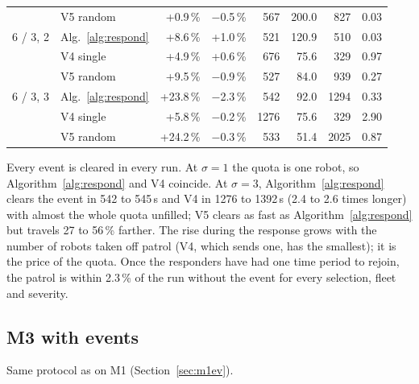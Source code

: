 \documentclass[11pt]{article}
\theoremstyle{definition}
\theoremstyle{plain}
\begin{document}
\begin{table}[H]
\begin{tabular}{llrrrrrr}
 & V5 random & +0.9\,\% & $-$0.5\,\% & 567 & 200.0 & 827 & 0.03 \\
6 / 3, 2 & Alg.~\ref{alg:respond} & +8.6\,\% & +1.0\,\% & 521 & 120.9 & 510 & 0.03 \\
 & V4 single & +4.9\,\% & +0.6\,\% & 676 & 75.6 & 329 & 0.97 \\
 & V5 random & +9.5\,\% & $-$0.9\,\% & 527 & 84.0 & 939 & 0.27 \\
6 / 3, 3 & Alg.~\ref{alg:respond} & +23.8\,\% & $-$2.3\,\% & 542 & 92.0 & 1294 & 0.33 \\
 & V4 single & +5.8\,\% & $-$0.2\,\% & 1276 & 75.6 & 329 & 2.90 \\
 & V5 random & +24.2\,\% & $-$0.3\,\% & 533 & 51.4 & 2025 & 0.87 \\
\bottomrule
\end{tabular}
\end{table}

Every event is cleared in every run. At $\sigma = 1$ the quota is one robot,
so Algorithm~\ref{alg:respond} and V4 coincide. At $\sigma = 3$,
Algorithm~\ref{alg:respond} clears the event in 542 to 545\,s and V4 in
1276 to 1392\,s (2.4 to 2.6 times longer) with almost the whole quota
unfilled; V5 clears as fast as Algorithm~\ref{alg:respond} but travels 27
to 56\,\% farther. The rise during the response grows with the number of
robots taken off patrol (V4, which sends one, has the smallest); it is the
price of the quota. Once the responders have had one time period to rejoin,
the patrol is within 2.3\,\% of the run without the event for every
selection, fleet and severity.

\subsection{M3 with events}

Same protocol as on M1 (Section~\ref{sec:m1ev}).
\end{document}
